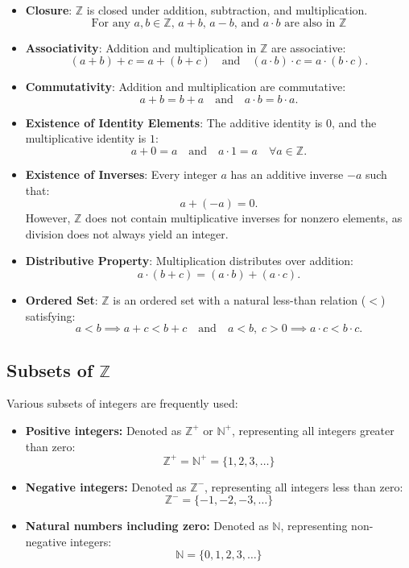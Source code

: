 \begin{itemize}
    \item \textbf{Closure}: \( \mathbb{Z} \) is closed under addition, subtraction, and multiplication. 
    \[
      \text{For any } a, b \in \mathbb{Z} \text{, } a + b  \text{,  }  a - b \text{, and }  a \cdot b \text{ are also in } \mathbb{Z}
    \]
    \item \textbf{Associativity}: Addition and multiplication in \( \mathbb{Z} \) are associative:
    \[
    (a + b) + c = a + (b + c) \quad \text{and} \quad (a \cdot b) \cdot c = a \cdot (b \cdot c).
    \]
    \item \textbf{Commutativity}: Addition and multiplication are commutative:
    \[
    a + b = b + a \quad \text{and} \quad a \cdot b = b \cdot a.
    \]
    \item \textbf{Existence of Identity Elements}: The additive identity is \( 0 \), and the multiplicative identity is \( 1 \):
    \[
    a + 0 = a \quad \text{and} \quad a \cdot 1 = a \quad \forall a \in \mathbb{Z}.
    \]
    \item \textbf{Existence of Inverses}: Every integer \( a \) has an additive inverse \( -a \) such that:
    \[
    a + (-a) = 0.
    \]
    However, \( \mathbb{Z} \) does not contain multiplicative inverses for nonzero elements, as division does not always yield an integer.
    
    \vspace{\baselineskip}\par
    \item \textbf{Distributive Property}: Multiplication distributes over addition:
    \[
    a \cdot (b + c) = (a \cdot b) + (a \cdot c).
    \]
    \item \textbf{Ordered Set}: \( \mathbb{Z} \) is an ordered set with a natural less-than relation (\( < \)) satisfying:
    \[
    a < b \implies a + c < b + c \quad \text{and} \quad a < b, \; c > 0 \implies a \cdot c < b \cdot c.
    \]
\end{itemize}


\subsection{Subsets of \( \mathbb{Z} \)}
Various subsets of integers are frequently used:

\begin{itemize}
    \item \textbf{Positive integers:} Denoted as \( \mathbb{Z}^+ \) or \( \mathbb{N}^+ \), representing all integers greater than zero:
    \[
    \mathbb{Z}^+ = \mathbb{N}^+ = \{1, 2, 3, \dots\}
    \]
    \item \textbf{Negative integers:} Denoted as \( \mathbb{Z}^- \), representing all integers less than zero:
    \[
    \mathbb{Z}^- = \{-1, -2, -3, \dots\}
    \]
    \item \textbf{Natural numbers including zero:} Denoted as \( \mathbb{N} \), representing non-negative integers:
    \[
    \mathbb{N} = \{0, 1, 2, 3, \dots\}
    \]
\end{itemize}


